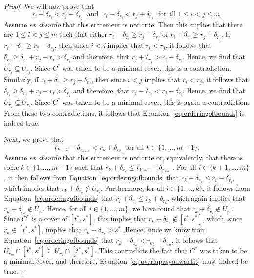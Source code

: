 \documentclass[10pt,a4paper]{paper}
\theoremstyle{definition}
\begin{document}
\begin{proof}
We will now prove that
\begin{equation}\label{eq:orderingofbounds}
r_i-\delta_{r_i}<r_j-\delta_{r_j}
\text{~~and~~}
r_i+\delta_{r_i}<r_j+\delta_{r_j}
\text{~~for all $1\leq i<j\leq m$.}
\end{equation}
Assume \emph{ex absurdo} that this statement is not true. Then this implies that there are $1\leq i<j\leq m$ such that either $r_i-\delta_{r_i}\geq r_j-\delta_{r_j}$ or $r_i+\delta_{r_i}\geq r_j+\delta_{r_j}$. If $r_i-\delta_{r_i}\geq r_j-\delta_{r_j}$, then since $i<j$ implies that $r_i<r_j$, it follows that $\delta_{r_j}\geq\delta_{r_i}+r_j-r_i>\delta_{r_i}$ and therefore, that $r_j+\delta_{r_j}>r_i+\delta_{r_i}$. 
Hence, we find that $U_{r_i}\subseteq U_{r_j}$. Since $C^*$ was taken to be a minimal cover, this is a contradiction.
Similarly, if $r_i+\delta_{r_i}\geq r_j+\delta_{r_j}$, then since $i<j$ implies that $r_i<r_j$, it follows that $\delta_{r_i}\geq\delta_{r_j}+r_j-r_i>\delta_{r_j}$ and therefore, that $r_i-\delta_{r_i}<r_j-\delta_{r_i}$. Hence, we find that $U_{r_j}\subseteq U_{r_i}$. Since $C^*$ was taken to be a minimal cover, this is again a contradiction. From these two contradictions, it follows that Equation~\eqref{eq:orderingofbounds} is indeed true.

Next, we prove that
\begin{equation}\label{eq:overlapasyouwantit}
r_{k+1}-\delta_{r_{k+1}}<r_k+\delta_{r_k}
\text{~~for all $k\in\{1,\dots,m-1\}$.}
\end{equation}
Assume \emph{ex absurdo} that this statement is not true or, equivalently, that there is some $k\in\{1,\dots,m-1\}$ such that $r_k+\delta_{r_k}\leq r_{k+1}-\delta_{r_{k+1}}$. For all $i\in\{k+1,\dots, m\}$, it then follows from Equation~\eqref{eq:orderingofbounds} that $r_k+\delta_{r_k}\leq r_i-\delta_{r_i}$, which implies that $r_k+\delta_{r_k}\notin U_{r_i}$. Furthermore, for all $i\in\{1,\dots,k\}$, it follows from Equation~\eqref{eq:orderingofbounds} that $r_i+\delta_{r_i}\leq r_k+\delta_{r_k}$, which again implies that $r_k+\delta_{r_k}\notin U_{r_i}$. 
Hence, for all $i\in\{1,\dots,m\}$, we have found that $r_k+\delta_{r_k}\notin U_{r_i}$. 
Since $C^*$ is a cover of $[t^*,s^*]$, this implies that $r_k+\delta_{r_k}\notin[t^*,s^*]$, which, since $r_k\in[t^*,s^*]$, implies that $r_k+\delta_{r_k}>s^*$. Hence, since we know from Equation~\eqref{eq:orderingofbounds} that $r_k-\delta_{r_k}<r_m-\delta_{r_m}$, it follows that $U_{r_m}\cap[t^*,s^*]\subseteq U_{r_k}\cap[t^*,s^*]$. This contradicts the fact that $C^*$ was taken to be a minimal cover, and therefore, Equation~\eqref{eq:overlapasyouwantit} must indeed be true.


\end{proof}
\end{document}
